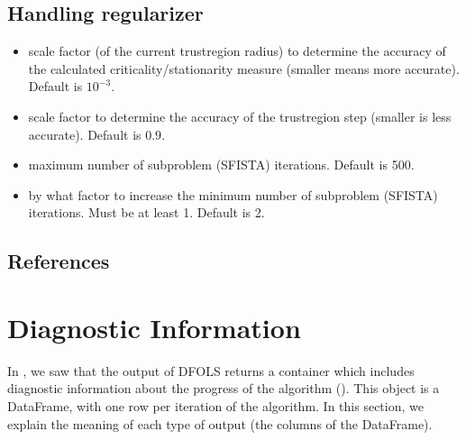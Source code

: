 \documentclass[letterpaper,10pt,english]{sphinxmanual}
\begin{document}
\section{Handling regularizer}
\label{\detokenize{advanced:handling-regularizer}}\begin{itemize}
\item {} 
\sphinxAtStartPar
{} \sphinxhyphen{} scale factor (of the current trust\sphinxhyphen{}region radius) to determine the accuracy of the calculated  criticality/stationarity measure (smaller means more accurate). Default is \(10^{-3}\).

\item {} 
\sphinxAtStartPar
{} \sphinxhyphen{} scale factor to determine the accuracy of the trust\sphinxhyphen{}region step (smaller is less accurate). Default is \(0.9\).

\item {} 
\sphinxAtStartPar
{} \sphinxhyphen{} maximum number of subproblem (S\sphinxhyphen{}FISTA) iterations. Default is 500.

\item {} 
\sphinxAtStartPar
{} \sphinxhyphen{} by what factor to increase the minimum number of subproblem (S\sphinxhyphen{}FISTA) iterations. Must be at least 1. Default is 2.

\end{itemize}


\section{References}
\label{\detokenize{advanced:references}}
\sphinxstepscope


\chapter{Diagnostic Information}
\label{\detokenize{diagnostic:diagnostic-information}}\label{\detokenize{diagnostic::doc}}
\sphinxAtStartPar
In {\hyperref[\detokenize{userguide::doc}]{}}, we saw that the output of DFO\sphinxhyphen{}LS returns a container which includes diagnostic information about the progress of the algorithm (). This object is a  DataFrame, with one row per iteration of the algorithm. In this section, we explain the meaning of each type of output (the columns of the DataFrame).
\end{document}
